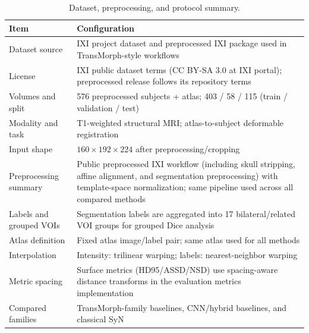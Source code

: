 \documentclass[jimaging,article,submit,pdftex,moreauthors]{Definitions/mdpi}
\begin{document}
\begin{table}[H]
\caption{Dataset, preprocessing, and protocol summary.\label{tab1}}
\begin{tabularx}{\textwidth}{lX}
\toprule
\textbf{Item} & \textbf{Configuration} \\
\midrule
Dataset source & IXI project dataset \cite{ixidataset} and preprocessed IXI package used in TransMorph-style workflows \\
License & IXI public dataset terms (CC BY-SA 3.0 at IXI portal); preprocessed release follows its repository terms \\
Volumes and split & 576 preprocessed subjects + atlas; 403 / 58 / 115 (train / validation / test) \\
Modality and task & T1-weighted structural MRI; atlas-to-subject deformable registration \\
Input shape & \(160 \times 192 \times 224\) after preprocessing/cropping \\
Preprocessing summary & Public preprocessed IXI workflow (including skull stripping, affine alignment, and segmentation preprocessing) with template-space normalization; same pipeline used across all compared methods \\
Labels and grouped VOIs & Segmentation labels are aggregated into 17 bilateral/related VOI groups for grouped Dice analysis \\
Atlas definition & Fixed atlas image/label pair; same atlas used for all methods \\
Interpolation & Intensity: trilinear warping; labels: nearest-neighbor warping \\
Metric spacing & Surface metrics (HD95/ASSD/NSD) use spacing-aware distance transforms in the evaluation metrics implementation \\
Compared families & TransMorph-family baselines, CNN/hybrid baselines, and classical SyN \\
\bottomrule
\end{tabularx}
\end{table}
\end{document}
